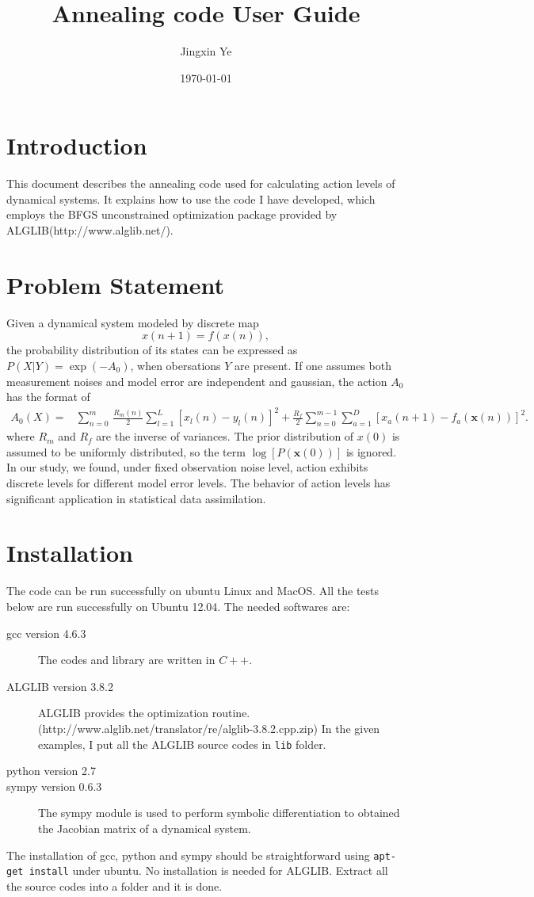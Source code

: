 \documentclass[11pt]{article}
\title{\textbf{Annealing code User Guide}}
\author{Jingxin Ye}
\date{\today}
\begin{document}
\maketitle
\section{Introduction}
This document describes the annealing code used for calculating action levels of dynamical systems. It explains how to use the code I have developed, which employs the BFGS unconstrained optimization package provided by ALGLIB(http://www.alglib.net/).
\section{Problem Statement}
Given a dynamical system modeled by discrete map
\[{x}(n+1)=f(x(n)),\]
the probability distribution of its states can be expressed as $P(X|Y)=\exp(-A_0)$, when obersations $Y$ are present.  If one assumes both measurement noises and model error are independent and gaussian, the action $A_0$ has the format of
\begin{align}
A_0(X) = &\sum_{n=0}^m\, \frac{R_m(n)}{2} \sum_{l=1}^L [x_l(n) - y_l(n)]^2 +  \frac{R_f}{2} \sum_{n=0}^{m-1} \sum_{a=1}^D[x_a(n+1) - f_a(\mathbf{x}(n))]^2 .
\label{eq:actionform}
\end{align}
where $R_m$ and $R_f$ are the inverse of variances. The prior distribution of $x(0)$ is assumed to be uniformly distributed, so the term $\log[P(\mathbf{x}(0))]$ is ignored. In our study, we found, under fixed observation noise level, action exhibits discrete levels for different model error levels. The behavior of action levels has significant application in statistical data assimilation.
\section{Installation} 
The code can be run successfully on ubuntu Linux and MacOS. All the tests below are run successfully on Ubuntu 12.04. The needed softwares are:
\begin{description}
\item[gcc version 4.6.3] The codes and library are written in $C++$. 
\item[ALGLIB version 3.8.2] ALGLIB provides the optimization routine.\\ (http://www.alglib.net/translator/re/alglib-3.8.2.cpp.zip) In the given examples, I put all the ALGLIB source codes in \texttt{lib} folder.
\item[python version 2.7]
\item[sympy version 0.6.3] The sympy module is used to perform symbolic differentiation to obtained the Jacobian matrix of a dynamical system.
\end{description}
The installation of gcc, python and sympy should be straightforward using \texttt{apt-get install} under ubuntu. No installation is needed for ALGLIB. Extract all the source codes into a folder and it is done.
\end{document}
